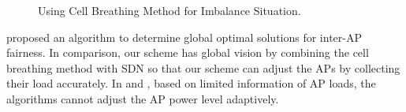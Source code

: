 \begin{figure}
	\centering
		
		
	\caption{Using Cell Breathing Method for Imbalance Situation.}
	\label{fig:cell-breathing}
\end{figure}


\cite{bejerano2009cell} proposed an algorithm to determine global optimal solutions for inter-AP fairness. In comparison, our scheme has global vision by combining the cell breathing method with SDN so that our scheme can adjust the APs by collecting their load accurately. In \cite{bahl2007cell} and \cite{bejerano2009cell}, based on limited information of AP loads, the algorithms cannot adjust the AP power level adaptively.

